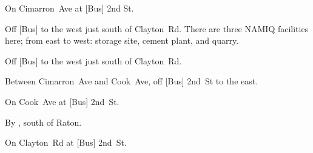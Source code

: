 
\begin{LocationList}

On Cimarron~Ave at [Bus] 2nd St.

Off [Bus] to the west just south of  Clayton~Rd.
There are three NAMIQ facilities here; from east to west: storage site, cement plant, and quarry.

Off [Bus] to the west just south of  Clayton~Rd.

Between Cimarron~Ave and Cook~Ave, off [Bus] 2nd~St to the east.

\Location{\TruckService \Service}
On Cook~Ave at [Bus] 2nd~St.

\Location{\TruckStop \Gas \Rest \Weigh}
By  , south of Raton.

On  Clayton~Rd at [Bus] 2nd~St.

\end{LocationList}
